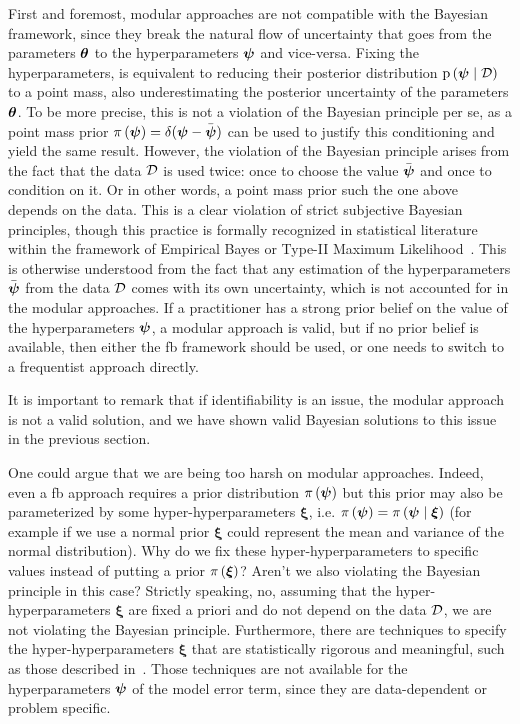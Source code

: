 \smallskip
First and foremost, modular approaches are not compatible with the Bayesian framework, since they break the natural flow of uncertainty that goes from the parameters $\boldsymbol{\theta}$ to the hyperparameters $\boldsymbol{\psi}$ and vice-versa. Fixing the hyperparameters, is equivalent to reducing their posterior distribution $\mathrm{p} \left( \boldsymbol{\psi} \mid \mathcal{D} \right)$ to a point mass, also underestimating the posterior uncertainty of the parameters $\boldsymbol{\theta}$. To be more precise, this is not a violation of the Bayesian principle per se, as a point mass prior $\pi \left( \boldsymbol{\psi}\right) = \delta(\boldsymbol{\psi} - \bar{\boldsymbol{\psi}})$ can be used to justify this conditioning and yield the same result. However, the violation of the Bayesian principle arises from the fact that the data $\mathcal{D}$ is used twice: once to choose the value $\bar{\boldsymbol{\psi}}$ and once to condition on it. Or in other words, a point mass prior such the one above depends on the data. This is a clear violation of strict subjective Bayesian principles, though this practice is formally recognized in statistical literature within the framework of Empirical Bayes or Type-II Maximum Likelihood~\cite{mod_approaches, uq_theory}. This is otherwise understood from the fact that any estimation of the hyperparameters $\bar{\boldsymbol{\psi}}$ from the data $\mathcal{D}$ comes with its own uncertainty, which is not accounted for in the modular approaches. If a practitioner has a strong prior belief on the value of the hyperparameters $\boldsymbol{\psi}$, a modular approach is valid, but if no prior belief is available, then either the \gls{fb} framework should be used, or one needs to switch to a frequentist approach directly.

\smallskip
It is important to remark that if identifiability is an issue, the modular approach is not a valid solution, and we have shown valid Bayesian solutions to this issue in the previous section. 

\smallskip
One could argue that we are being too harsh on modular approaches. Indeed, even a \gls{fb} approach requires a prior distribution $\pi \left( \boldsymbol{\psi}\right)$ but this prior may also be parameterized by some hyper-hyperparameters $\boldsymbol{\xi}$, i.e. $\pi \left( \boldsymbol{\psi}\right) = \pi \left( \boldsymbol{\psi} \mid \boldsymbol{\xi}\right)$ (for example if we use a normal prior $\boldsymbol{\xi}$ could represent the mean and variance of the normal distribution). Why do we fix these hyper-hyperparameters to specific values instead of putting a prior $\pi \left( \boldsymbol{\xi}\right)$? Aren't we also violating the Bayesian principle in this case? Strictly speaking, no, assuming that the hyper-hyperparameters $\boldsymbol{\xi}$ are fixed a priori and do not depend on the data $\mathcal{D}$, we are not violating the Bayesian principle. Furthermore, there are techniques to specify the hyper-hyperparameters $\boldsymbol{\xi}$ that are statistically rigorous and meaningful, such as those described in~\cite{stat_dec_th}. Those techniques are not available for the hyperparameters $\boldsymbol{\psi}$ of the model error term, since they are data-dependent or problem specific. 

